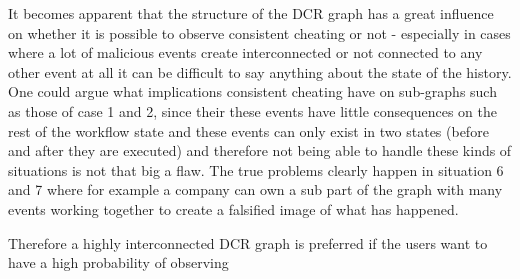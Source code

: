 \newpar It becomes apparent that the structure of the DCR graph has a great influence on whether it is possible to observe consistent cheating or not - especially in cases where a lot of malicious events create interconnected or not connected to any other event at all it can be difficult to say anything about the state of the history. One could argue what implications consistent cheating have on sub-graphs such as those of case 1 and 2, since their these events have little consequences on the rest of the workflow state and these events can only exist in two states (before and after they are executed) and therefore not being able to handle these kinds of situations is not that big a flaw. The true problems clearly happen in situation 6 and 7 where for example a company can own a sub part of the graph with many events working together to create a falsified image of what has happened. 

\newpar Therefore a highly interconnected DCR graph is preferred if the users want to have a high probability of observing 

